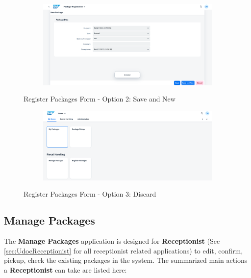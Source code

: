 \begin{figure}[H]
	\centering
    \begin{subfigure}{1\linewidth}
        \centering
        \includegraphics[width=1\linewidth]{images/user_doc/registration/saveAndNewToast.png}
    \end{subfigure}
    \caption{Register Packages Form - Option 2: Save and New}
    \label{fig:RPsaveNewOp}
\end{figure}

\begin{figure}[H]
	\centering
    \begin{subfigure}{1\linewidth}
        \centering
        \includegraphics[width=1\linewidth]{images/user_doc/registration/discardTarget.png}
    \end{subfigure}
    \caption{Register Packages Form - Option 3: Discard}
    \label{fig:RPdiscardOp}
\end{figure}

\subsection{Manage Packages}                     
\label{subsec:mp}

The \textbf{Manage Packages} application is designed for \textbf{Receptionist} (See \autoref{sec:UdocReceptionist} for all receptionist related applications) to edit, confirm, pickup, check the existing packages in the system. The summarized main actions a \textbf{Receptionist} can take are listed here:

